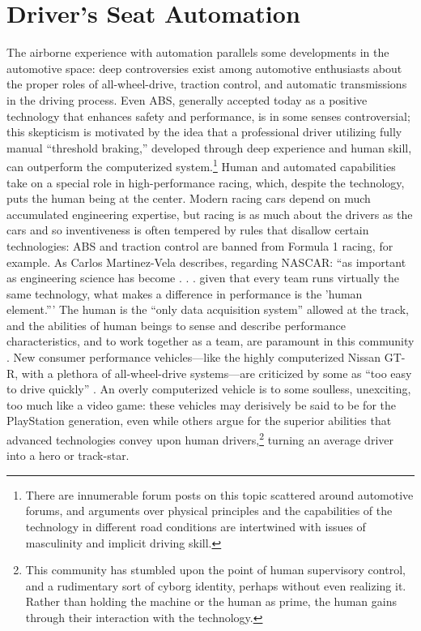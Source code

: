 \section{Driver's Seat Automation}

The airborne experience with automation parallels some developments
in the automotive space: deep controversies exist among automotive
enthusiasts about the proper roles of all-wheel-drive, traction
control, and automatic transmissions in the driving process. Even ABS,
generally accepted today as a positive technology that enhances safety and
performance, is in some senses controversial; this skepticism is
motivated by the idea that 
a professional driver utilizing fully manual ``threshold braking,''
developed through deep experience and human skill, can outperform the
computerized system.\footnote{There are innumerable forum posts on
  this topic scattered around automotive forums, and arguments over
  physical principles and the capabilities of the technology in
  different road conditions are
  intertwined with issues of masculinity and implicit driving skill.}
Human and automated capabilities take on a special role in
  high-performance racing, which, despite the technology, puts the
  human being at the center. Modern racing cars depend on
much accumulated engineering expertise, but racing is as much about
the drivers as the cars and so inventiveness is often tempered by
rules that disallow certain technologies:  ABS and traction control are
banned from Formula 1 racing, for example. As Carlos Martinez-Vela
describes, regarding NASCAR: ``as important as engineering science has
become . . . given
that every team runs virtually the same technology, what makes a
difference in performance is the 'human element.''' The human is the ``only data acquisition
system'' allowed at the track, and the abilities of human beings to
sense and describe performance characteristics, and to work together
as a team, are paramount in this community \cite[p.
  178]{martinezvela}. New consumer performance vehicles---like the 
highly computerized Nissan GT-R, with a plethora of all-wheel-drive
systems---are criticized by some as ``too easy to drive quickly'' \cite{edmunds}.
An overly computerized vehicle is to some soulless, unexciting, too much like
a video game: these vehicles may derisively be said to be for the
PlayStation generation, even while others argue for the superior
abilities that advanced technologies convey upon human
drivers,\footnote{This community has stumbled upon the point of
  human supervisory control, and a rudimentary sort of cyborg
  identity, perhaps without even realizing it. Rather than holding the
machine or the human as prime, the human gains through their
interaction with the technology.}
turning an average driver into a hero or track-star.

